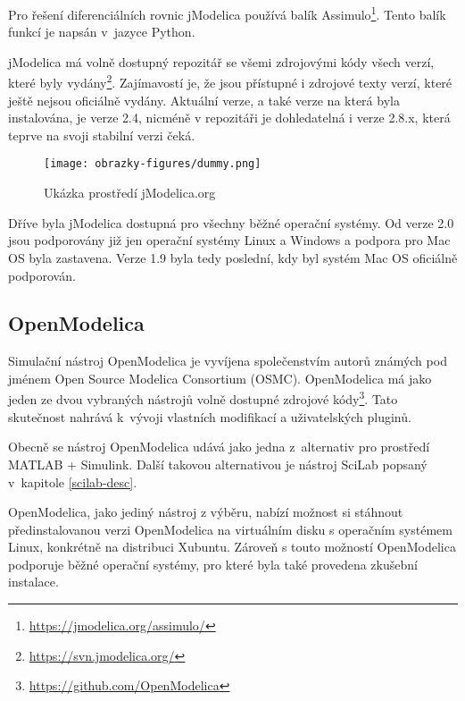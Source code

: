 Pro řešení diferenciálních rovnic jModelica používá balík Assimulo\footnote{\url{https://jmodelica.org/assimulo/}}. Tento balík funkcí je napsán v~jazyce Python. 


jModelica má volně dostupný repozitář se všemi zdrojovými kódy všech verzí, které byly vydány\footnote{\url{https://svn.jmodelica.org/}}. Zajímavostí je, že jsou přístupné i zdrojové texty verzí, které ještě nejsou oficiálně vydány. Aktuální verze, a také verze na která byla instalována, je verze 2.4, nicméně v repozitáři je dohledatelná i verze 2.8.x, která teprve na svoji stabilní verzi čeká.

\begin{figure}
    \centering
    \texttt{[image: obrazky-figures/dummy.png]}
    \caption{Ukázka prostředí jModelica.org}
    \label{fig:jmodelica}
\end{figure}

Dříve byla jModelica dostupná pro všechny běžné operační systémy. Od verze 2.0 jsou podporovány již jen operační systémy Linux a Windows a podpora pro Mac OS byla zastavena. Verze 1.9 byla tedy poslední, kdy byl systém Mac OS oficiálně podporován.

\subsection{OpenModelica}
\label{openmodelica-desc}
Simulační nástroj OpenModelica je vyvíjena společenstvím autorů známých pod jménem Open Source Modelica Consortium (OSMC). OpenModelica má jako jeden ze dvou vybraných nástrojů volně dostupné zdrojové kódy\footnote{\url{https://github.com/OpenModelica}}. Tato skutečnost nahrává k~vývoji vlastních modifikací a uživatelských pluginů.

Obecně se nástroj OpenModelica udává jako jedna z~alternativ pro prostředí MATLAB + Simulink. Další takovou alternativou je nástroj SciLab popsaný v~kapitole \ref{scilab-desc}.

OpenModelica, jako jediný nástroj z výběru, nabízí možnost si stáhnout předinstalovanou verzi OpenModelica na virtuálním disku s operačním systémem Linux, konkrétně na distribuci Xubuntu. Zároveň s touto možností OpenModelica podporuje běžné operační systémy, pro které byla také provedena zkušební instalace.

